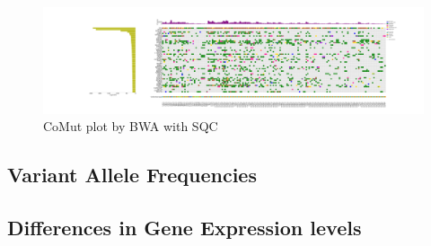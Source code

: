 \documentclass[a4paper]{article}
\begin{document}
            \begin{figure}[htbp]
                \centering
                \includegraphics[width=\linewidth]{figures/Mutect2/BWA-SQC.pdf}
                \caption{CoMut plot by BWA with SQC}
                \label{fig:comut-BWA-SQC}
            \end{figure}

        \subsection{Variant Allele Frequencies}

        \subsection{Differences in Gene Expression levels}
\end{document}
